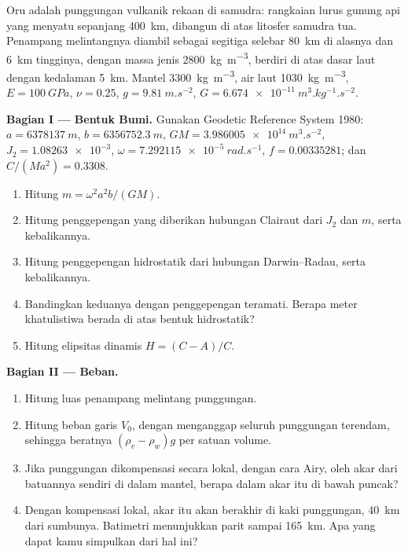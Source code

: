 \begin{problem}
\label{pb:b3:gravity-geodesy:1}
Oru adalah punggungan vulkanik rekaan di samudra: rangkaian lurus
gunung api yang menyatu sepanjang \qty{400}{km}, dibangun di atas litosfer samudra tua. Penampang melintangnya
diambil sebagai segitiga selebar \qty{80}{km} di alasnya dan
\qty{6}{km} tingginya, dengan massa jenis \qty{2800}{kg.m^{-3}}, berdiri di atas dasar laut
dengan kedalaman \qty{5}{km}. Mantel \qty{3300}{kg.m^{-3}}, air laut
\qty{1030}{kg.m^{-3}}, $E = \qty{100}{GPa}$, $\nu = 0.25$, $g =
\qty{9.81}{m.s^{-2}}$, $G = \qty{6.674e-11}{m^3.kg^{-1}.s^{-2}}$.

\medskip
\noindent\textbf{Bagian I --- Bentuk Bumi.} Gunakan Geodetic Reference
System 1980: $a = \qty{6378137}{m}$, $b = \qty{6356752.3}{m}$,
$GM = \qty{3.986005e14}{m^3.s^{-2}}$, $J_2 = \num{1.08263e-3}$,
$\omega = \qty{7.292115e-5}{rad.s^{-1}}$, $f = \num{0.00335281}$; dan
$C/(Ma^2) = \num{0.3308}$.
\begin{enumerate}
  \item Hitung $m = \omega^2a^2b/(GM)$.
  \item Hitung penggepengan yang diberikan hubungan Clairaut dari $J_2$ dan
        $m$, serta kebalikannya.
  \item Hitung penggepengan hidrostatik dari hubungan Darwin--Radau, serta
        kebalikannya.
  \item Bandingkan keduanya dengan penggepengan teramati. Berapa meter
        khatulistiwa berada di atas bentuk hidrostatik?
  \item Hitung elipsitas dinamis $H = (C - A)/C$.
\end{enumerate}

\noindent\textbf{Bagian II --- Beban.}
\begin{enumerate}[resume]
  \item Hitung luas penampang melintang punggungan.
  \item Hitung beban garis $V_0$, dengan menganggap seluruh punggungan terendam, sehingga
        beratnya $(\rho_v - \rho_w)g$ per satuan volume.
  \item Jika punggungan dikompensasi secara lokal, dengan cara Airy, oleh akar dari
        batuannya sendiri di dalam mantel, berapa dalam akar itu di bawah
        puncak?
  \item Dengan kompensasi lokal, akar itu akan berakhir di kaki punggungan,
        \qty{40}{km} dari sumbunya. Batimetri menunjukkan parit sampai
        \qty{165}{km}. Apa yang dapat kamu simpulkan dari hal ini?
\end{enumerate}


\end{problem}
